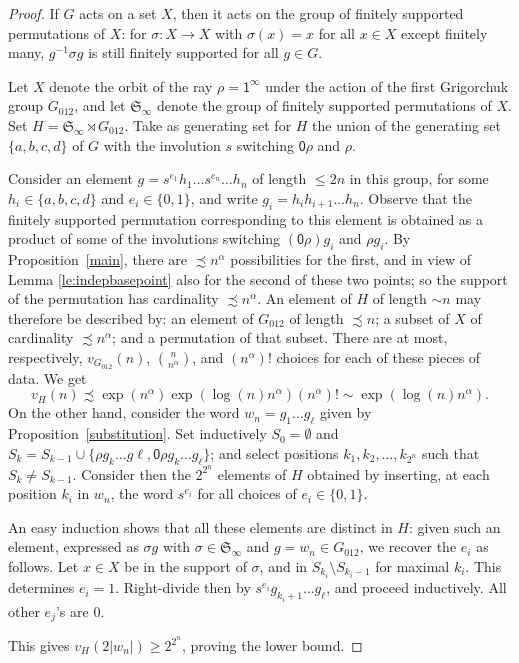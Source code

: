 \documentclass{amsart}
\newcommand\Grig{{G_{012}}}
\theoremstyle{definition}
\begin{document}
\begin{proof}
  If $G$ acts on a set $X$, then it acts on the group of finitely
  supported permutations of $X$: for $\sigma: X \to X$ with
  $\sigma(x)=x$ for all $x\in X$ except finitely many, $g^{-1}\sigma
  g$ is still finitely supported for all $g\in G$.

  Let $X$ denote the orbit of the ray $\rho=\mathsf1^\infty$ under the
  action of the first Grigorchuk group $\Grig$, and let $\mathfrak
  S_\infty$ denote the group of finitely supported permutations of
  $X$. Set $H=\mathfrak S_\infty\rtimes\Grig$.  Take as generating set
  for $H$ the union of the generating set $\{a,b,c,d\}$ of $G$ with
  the involution $s$ switching $\mathsf0\rho$ and $\rho$.

  Consider an element $g=s^{e_1}h_1\dots s^{e_n}\dots h_n$ of length
  $\le2n$ in this group, for some $h_i\in\{a,b,c,d\}$ and
  $e_i\in\{0,1\}$, and write $g_i=h_ih_{i+1}\dots h_n$.  Observe that
  the finitely supported permutation corresponding to this element is obtained
  as a product of some of the involutions switching
  $(\mathsf0\rho)g_i$ and $\rho g_i$. By Proposition~\ref{main}, there
  are $\precsim n^\alpha$ possibilities for the first, and in view of
  Lemma \ref{le:indepbasepoint} also for the second of these two
  points;
  so the support of the permutation has
  cardinality $\precsim n^\alpha$. An element of $H$ of length
  $\sim n$ may therefore be described by: an element of $\Grig$ of
  length $\precsim n$; a subset of $X$ of cardinality $\precsim
  n^\alpha$; and a permutation of that subset. There are at most,
  respectively, $v_\Grig(n)$, $\binom{n}{n^\alpha}$, and $(n^\alpha)!$
  choices for each of these pieces of data.  We get
  \[v_H(n) \precsim \exp(n^\alpha) \exp(\log(n)n^\alpha)(n^\alpha)!\sim\exp(\log(n)n^\alpha).
  \]
  On the other hand, consider the word $w_n=g_1\dots g_\ell$ given by
  Proposition~\ref{substitution}. Set inductively $S_0=\emptyset$ and
  $S_k=S_{k-1}\cup\{\rho g_k\dots g\ell,\mathsf0\rho g_k\dots
  g_\ell\}$; and select positions $k_1,k_2,\dots,k_{2^n}$ such that
  $S_k\neq S_{k-1}$. Consider then the $2^{2^n}$ elements of $H$
  obtained by inserting, at each position $k_i$ in $w_n$, the word
  $s^{e_i}$ for all choices of $e_i\in\{0,1\}$.

  An easy induction shows that all these elements are distinct in $H$:
  given such an element, expressed as $\sigma g$ with
  $\sigma\in\mathfrak S_\infty$ and $g=w_n\in\Grig$, we recover the
  $e_i$ as follows. Let $x\in X$ be in the support of $\sigma$, and in
  $S_{k_i}\setminus S_{k_i-1}$ for maximal $k_i$. This determines
  $e_i=1$. Right-divide then by $s^{e_i}g_{k_i+1}\dots g_\ell$, and
  proceed inductively. All other $e_j$'s are $0$.

  This gives $v_H(2|w_n|)\ge2^{2^n}$, proving the lower bound.
\end{proof}
\end{document}
